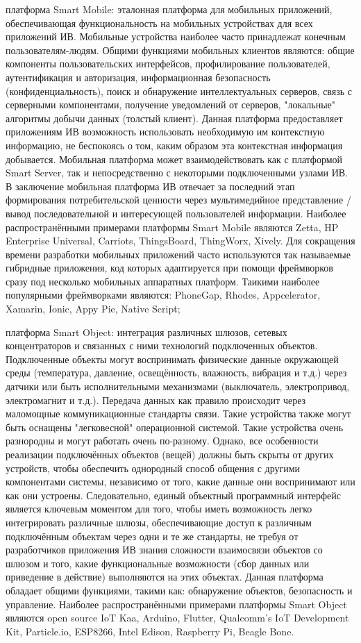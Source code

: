 \begin{textitemize}
	\item платформа Smart Mobile: эталонная платформа для мобильных приложений, обеспечивающая функциональность на мобильных устройствах для всех приложений ИВ. Мобильные устройства наиболее часто принадлежат конечным пользователям-людям. Общими функциями мобильных клиентов являются: общие компоненты пользовательских интерфейсов, профилирование пользователей, аутентификация и авторизация, информационная безопасность (конфиденциальность), поиск и обнаружение интеллектуальных серверов, связь с серверными компонентами, получение уведомлений от серверов, "локальные"{} алгоритмы добычи данных (толстый клиент). Данная платформа предоставляет приложениям ИВ возможность использовать необходимую им контекстную информацию, не беспокоясь о том, каким образом эта контекстная информация добывается. Мобильная платформа может взаимодействовать как с платформой Smart Server, так и непосредственно с некоторыми подключенными узлами ИВ. В заключение мобильная платформа ИВ отвечает за последний этап формирования потребительской ценности через мультимедийное представление / вывод последовательной и интересующей пользователей информации. Наиболее распространёнными примерами платформы Smart Mobile являются Zetta, HP Enterprise Universal, Carriots, ThingsBoard, ThingWorx, Xively. Для сокращения времени разработки мобильных приложений часто используются так называемые гибридные приложения, код которых адаптируется при помощи фреймворков сразу под несколько мобильных аппаратных платформ. Таикими наиболее популярными фреймворками являются: PhoneGap, Rhodes, Appcelerator, Xamarin, Ionic, Appy Pie, Native Script;
	\item платформа Smart Object: интеграция различных шлюзов, сетевых концентраторов и связанных с ними технологий подключенных объектов. Подключенные объекты могут воспринимать физические данные окружающей среды (температура, давление, освещённость, влажность, вибрация и т.д.) через датчики или быть исполнительными механизмами (выключатель, электропривод, электромагнит и т.д.). Передача данных как правило происходит через маломощные коммуникационные стандарты связи. Такие устройства также могут быть оснащены "легковесной"{} операционной системой. Такие устройства очень разнородны и могут работать очень по-разному. Однако, все особенности реализации подключённых объектов (вещей) должны быть скрыты от других устройств, чтобы обеспечить однородный способ общения с другими компонентами системы, независимо от того, какие данные они воспринимают или как они устроены. Следовательно, единый объектный программный интерфейс является ключевым моментом для того, чтобы иметь возможность легко интегрировать различные шлюзы, обеспечивающие доступ к различным подключённым объектам через одни и те же стандарты, не требуя от разработчиков приложения ИВ знания сложности взаимосвязи объектов со шлюзом и того, какие функциональные возможности (сбор данных или приведение в действие) выполняются на этих объектах. Данная платформа обладает общими функциями, такими как: обнаружение объектов, безопасность и управление. Наиболее распространёнными примерами платформы Smart Object являются open source IoT Kaa, Arduino, Flutter, Qualcomm’s IoT Development Kit, Particle.io, ESP8266, Intel Edison, Raspberry Pi, Beagle Bone.

\end{textitemize}
